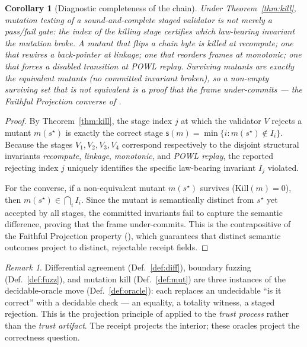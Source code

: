 \documentclass[11pt,oneside]{book}
\theoremstyle{definition}
\theoremstyle{plain}
\newtheorem{corollary}[theorem]{Corollary}
\theoremstyle{remark}
\newtheorem*{remark}{Remark}
\newcommand{\Kill}{\mathrm{Kill}}
\newcommand{\stg}{\mathsf{s}}                  %
\begin{document}
\begin{corollary}[Diagnostic completeness of the chain]\label{cor:diag}
Under Theorem~\ref{thm:kill}, mutation testing of a sound-and-complete staged validator is not merely a pass/fail gate: the \emph{index} of the killing stage certifies \emph{which} law-bearing invariant the mutation broke. %
A mutant that flips a chain byte is killed at \emph{recompute}; one that rewires a back-pointer at \emph{linkage}; one that reorders frames at \emph{monotonic}; one that forces a disabled transition at \emph{POWL replay}. %
Surviving mutants are exactly the equivalent mutants (no committed invariant broken), so a non-empty surviving set that is \emph{not} equivalent is a proof that the frame under-commits --- the Faithful Projection converse of \cite[Thm.~3.2]{chatman2025}. %
\end{corollary}

\begin{proof}
By Theorem~\ref{thm:kill}, the stage index $j$ at which the validator $V$ rejects a mutant $m(s^\star)$ is exactly the correct stage $\stg(m) = \min \{ i : m(s^\star) \notin I_i \}$. %
Because the stages $V_1, V_2, V_3, V_4$ correspond respectively to the disjoint structural invariants \emph{recompute}, \emph{linkage}, \emph{monotonic}, and \emph{POWL replay}, the reported rejecting index $j$ uniquely identifies the specific law-bearing invariant $I_j$ violated. %

For the converse, if a non-equivalent mutant $m(s^\star)$ survives ($\Kill(m) = 0$), then $m(s^\star) \in \bigcap_i I_i$. %
Since the mutant is semantically distinct from $s^\star$ yet accepted by all stages, the committed invariants fail to capture the semantic difference, proving that the frame under-commits. %
This is the contrapositive of the Faithful Projection property (\cite[Thm.~3.2]{chatman2025}), which guarantees that distinct semantic outcomes project to distinct, rejectable receipt fields. %
\end{proof}

\begin{remark}
Differential agreement (Def.~\ref{def:diff}), boundary fuzzing (Def.~\ref{def:fuzz}), and mutation kill (Def.~\ref{def:mut}) are three instances of the decidable-oracle move (Def.~\ref{def:oracle}): each replaces an undecidable ``is it correct'' with a decidable check --- an equality, a totality witness, a staged rejection. %
This is the projection principle of \cite{chatman2025} applied to the \emph{trust process} rather than the \emph{trust artifact}. %
The receipt projects the interior; these oracles project the correctness question. %
\end{remark}
\end{document}
